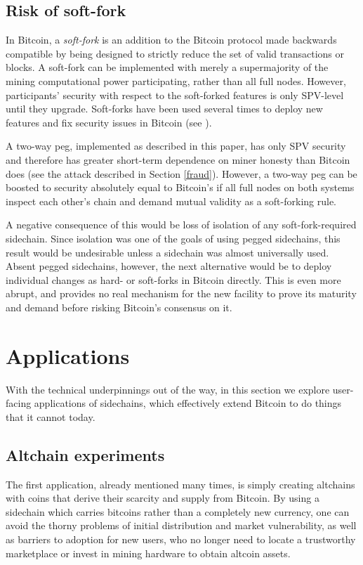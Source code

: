 \documentclass[letterpaper]{article}
\newcommand{\sidechain}{sidechain\xspace}
\newcommand{\sidechains}{sidechains\xspace}
\newcommand{\peggedsidechains}{pegged sidechains\xspace}
\newcommand{\altcoin}{altcoin\xspace}
\newcommand{\altchains}{altchains\xspace}
\begin{document}
\subsection{Risk of soft-fork\label{softfork}}
In Bitcoin, a \emph{soft-fork} is an addition to the Bitcoin protocol made
backwards compatible by being designed to strictly reduce the set of valid
transactions or blocks. A soft-fork can be implemented with merely a supermajority
of the mining computational power participating, rather than all full nodes.
However, participants' security with respect to the soft-forked features is only SPV-level until they upgrade.
Soft-forks have been used several times to deploy new features
and fix security issues in Bitcoin (see \cite{andresen2012-1}).

A two-way peg, implemented as described in this paper, has only SPV security
and therefore has greater short-term dependence on miner honesty than Bitcoin
does (see the attack described in Section \ref{fraud}). However, a two-way peg can be
boosted to security absolutely equal to Bitcoin's if all full nodes on both
systems inspect each other's chain and demand mutual validity as a
soft-forking rule.

A negative consequence of this would be loss of isolation of any
soft-fork-required sidechain. Since isolation was one of the goals of using
\peggedsidechains, this result would be undesirable unless a sidechain was almost
universally used. Absent \peggedsidechains, however, the next alternative
would be to deploy individual changes as hard- or soft-forks in Bitcoin
directly. This is even more abrupt, and provides no real mechanism for the
new facility to prove its maturity and demand before risking Bitcoin's
consensus on it.

\section{Applications\label{app}}

With the technical underpinnings out of the way, in this section we explore user-facing
applications of \sidechains, which effectively extend Bitcoin to do things
that it cannot today.

\subsection{Altchain experiments}
The first application, already mentioned many times, is simply creating \altchains with coins
that derive their scarcity and supply from Bitcoin. By using a \sidechain which carries
bitcoins rather than a completely new currency, one can avoid the thorny problems of initial distribution and market vulnerability, as well as barriers to adoption for new users, who no
longer need to locate a trustworthy marketplace or invest in mining hardware to obtain \altcoin assets.
\end{document}
